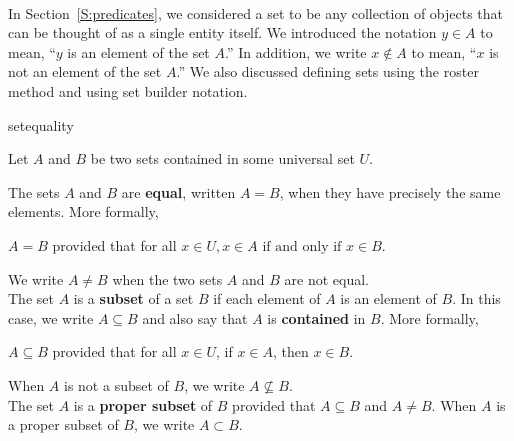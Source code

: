 \begin{previewactivity} \label{PA:setequality} \hfill \\
In Section~\ref{S:predicates}, we considered a set to be any collection of objects that can be thought of as a single entity itself.  We introduced the notation  $y \in A$  to mean, ``$y$ is an element of the set  $A$.''  In addition, we write  $x \notin A$  to mean, ``$x$  is not an element of the set  $A$.''  We also discussed defining sets using the roster method and using set builder notation.

\begin{defbox}{setequality}{
Let $A$ and $B$ be two sets contained in some universal set $U$.  

The sets  $A$  and  $B$ are \textbf{equal}, \label{sym:setequal2} 
%
%
written  $A = B$, when they have precisely the same elements.  More formally,
\begin{center}
$A = B$ provided that for all $x \in U, x \in A \text{ if and only if } x \in B$.
\end{center}
We write  $A \ne B$ when the two sets  $A$  and  $B$ are not equal.\\

The set  $A$  is a \textbf{subset} of a set  $B$  if each element of  $A$  is an element of 
$B$.  In this case, we write  $A \subseteq B$ and also say that  $A$  is \textbf{contained} \label{sym:subset2}
%
 in  $B$.  More formally,
\begin{center}
$A \subseteq B$ provided that for all $x \in U$, if $x \in A$, then $x \in B$.
\end{center}
When  $A$  is not a subset of  $B$, we write  $A\not  \subseteq B$. \label{sym:notsubset2} \\

The set  $A$  is a \textbf{proper subset} \label{sym:propersub}
%
%
of $B$ provided that $A \subseteq B$ and  $A \ne B$.  When $A$ is a proper subset of $B$, we write $A \subset B$.}
\end{defbox}

%


\end{previewactivity}
